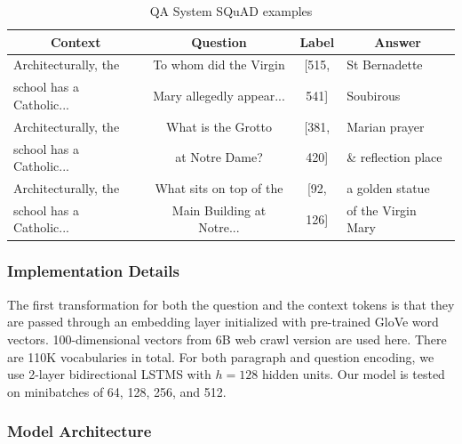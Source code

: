 \begin{table}[!t]
\vspace{-5pt}
\scriptsize
\vspace{7pt}
\caption{QA System SQuAD examples}\label{tbl:qasystem}
\vspace{-10pt}
\begin{center}
\begin{tabular}{ l|c|c|l}
 \multicolumn{1}{c|}{Context} &
 \multicolumn{1}{c|}{Question} &
 \multicolumn{1}{c|}{Label} &
 \multicolumn{1}{c}{Answer}\\
\hline
Architecturally, the  & To whom did the Virgin  & [515,  & St Bernadette 
\\
school has a Catholic...  & Mary allegedly appear... & 541] & Soubirous \\ \hline

Architecturally, the  & What is the Grotto  & [381,  & Marian prayer 
\\
school has a Catholic...  & at Notre Dame? & 420] & \& reflection place \\ \hline

Architecturally, the  & What sits on top of the	  & [92,  & a golden statue 
\\
school has a Catholic...  & Main Building at Notre... & 126] & of the Virgin Mary \\ 

\end{tabular}
\end{center}
\vspace{-15pt}
\end{table}


\subsubsection{Implementation Details}

The first transformation for both the question and the context tokens is that they are passed through an embedding layer initialized with pre-trained GloVe word vectors. 100-dimensional vectors from 6B web crawl version are used here. There are 110K vocabularies in total. For both paragraph and question encoding, we use 2-layer bidirectional LSTMS with $h = 128$ hidden units. Our model is tested on minibatches of 64, 128, 256, and 512. 


\subsubsection{Model Architecture}



